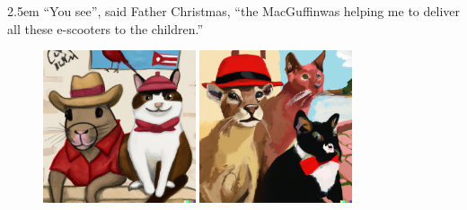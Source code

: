 \documentclass{article}
\newcommand{\imagewidthfactor}{0.4}
\newcommand{\addmarginA}{2.5em}
\newcommand{\addmarginB}{2.5em}
\begin{document}
\begin{addmargin}[\addmarginA]{\addmarginB}
``You see'', said Father Christmas, ``the MacGuffin\linebreak was helping me to
deliver all these e-scooters to the children.''
\end{addmargin}

\newpage %

\begin{figure}[h!]
\centering
\includegraphics[width=\imagewidthfactor\textwidth]{media/8a.png}
\quad
\includegraphics[width=\imagewidthfactor\textwidth]{media/8b.png}\\

\end{figure}
\end{document}
